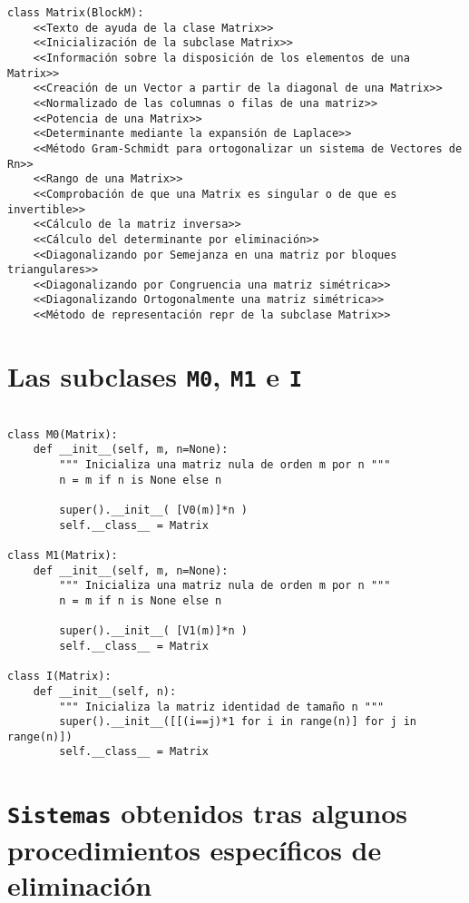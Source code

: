 \documentclass[11pt]{report}
\begin{document}
\begin{verbatim}
class Matrix(BlockM):
    <<Texto de ayuda de la clase Matrix>>
    <<Inicialización de la subclase Matrix>>
    <<Información sobre la disposición de los elementos de una Matrix>>
    <<Creación de un Vector a partir de la diagonal de una Matrix>>
    <<Normalizado de las columnas o filas de una matriz>>
    <<Potencia de una Matrix>>
    <<Determinante mediante la expansión de Laplace>>
    <<Método Gram-Schmidt para ortogonalizar un sistema de Vectores de Rn>>
    <<Rango de una Matrix>>
    <<Comprobación de que una Matrix es singular o de que es invertible>>
    <<Cálculo de la matriz inversa>>
    <<Cálculo del determinante por eliminación>>
    <<Diagonalizando por Semejanza en una matriz por bloques triangulares>>
    <<Diagonalizando por Congruencia una matriz simétrica>>
    <<Diagonalizando Ortogonalmente una matriz simétrica>>
    <<Método de representación repr de la subclase Matrix>>
\end{verbatim}


\chapter{Las subclases \texttt{M0}, \texttt{M1} e \texttt{I}}
\label{sec:org6d82d77}

\begin{verbatim}

class M0(Matrix):
    def __init__(self, m, n=None):
        """ Inicializa una matriz nula de orden m por n """
        n = m if n is None else n

        super().__init__( [V0(m)]*n )
        self.__class__ = Matrix

class M1(Matrix):
    def __init__(self, m, n=None):
        """ Inicializa una matriz nula de orden m por n """
        n = m if n is None else n

        super().__init__( [V1(m)]*n )
        self.__class__ = Matrix

class I(Matrix):
    def __init__(self, n):
        """ Inicializa la matriz identidad de tamaño n """
        super().__init__([[(i==j)*1 for i in range(n)] for j in range(n)])
        self.__class__ = Matrix

\end{verbatim}


\chapter{\texttt{Sistemas} obtenidos tras algunos procedimientos específicos de eliminación}
\label{sec:org42630ac}
\end{document}
